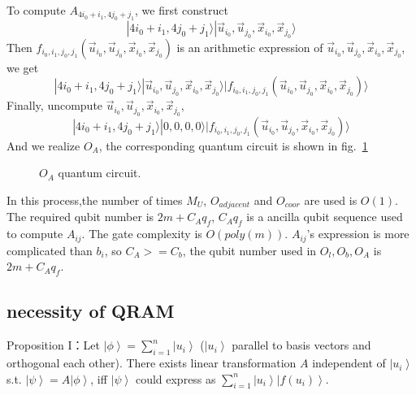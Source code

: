 \documentclass[%
 reprint,
 amsmath,amssymb,
pra,
]{revtex4-1}
\begin{document}
\begin{itemize}
To compute $A_{4i_0+i_1,4j_0+j_1}$, we first construct
$$
|4i_0+i_1,4j_0+j_1\rangle|\vec{u}_{i_0},\vec{u}_{j_0},\vec{x}_{i_0},\vec{x}_{j_0}\rangle
$$
Then $f_{i_0,i_1,j_0,j_1}(\vec{u}_{i_0},\vec{u}_{j_0},\vec{x}_{i_0},\vec{x}_{j_0})$  is an arithmetic expression of $\vec{u}_{i_0},\vec{u}_{j_0},\vec{x}_{i_0},\vec{x}_{j_0}$, we get
$$
|4i_0+i_1,4j_0+j_1\rangle|\vec{u}_{i_0},\vec{u}_{j_0},\vec{x}_{i_0},\vec{x}_{j_0}\rangle|f_{i_0,i_1,j_0,j_1}(\vec{u}_{i_0},\vec{u}_{j_0},\vec{x}_{i_0},\vec{x}_{j_0})\rangle
$$
Finally, uncompute $\vec{u}_{i_0},\vec{u}_{j_0},\vec{x}_{i_0},\vec{x}_{j_0}$,
$$
|4i_0+i_1,4j_0+j_1\rangle|0,0,0,0\rangle|f_{i_0,i_1,j_0,j_1}(\vec{u}_{i_0},\vec{u}_{j_0},\vec{x}_{i_0},\vec{x}_{j_0})\rangle
$$
And we realize $O_A$, the corresponding quantum circuit is shown in fig.~\ref{OA} 
\begin{figure}[htbp]
    \caption{$O_A$ quantum circuit. }
    \label{OA}
\end{figure}
In this process,the number of times $M_U$, $O_{adjacent}$ and $O_{coor}$ are used is $O(1)$. The required qubit number is $2m+C_Aq_f$, $C_Aq_f$ is a ancilla qubit sequence used to compute $A_{ij}$. The gate complexity is $O(poly(m))$. $A_{ij}$'s expression is more complicated than $b_i$, so $C_A>=C_b$, the qubit number used in $O_l,O_b,O_A$ is $2m+C_Aq_f$.

\subsection{necessity of QRAM}
\noindent Proposition I：Let $\left|\phi\right\rangle = \sum_{i=1}^n \left|u_i\right\rangle$ ($\left|u_i\right\rangle$ parallel to basis vectors and orthogonal each other). There exists 
linear transformation $A$ independent of $\left|u_{i}\right\rangle$ s.t. $\left|\psi\right\rangle = A\left|\phi\right\rangle$, iff $\left|\psi\right\rangle$ could express as $\sum_{i=1}^{n}\left|u_i\right\rangle\left|f\left(u_i\right)\right\rangle$.


\end{itemize}
\end{document}
